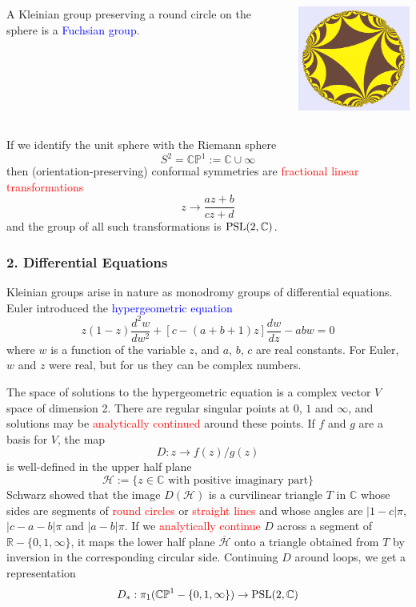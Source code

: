 \documentclass{beamer}
\def\R{\mathbb{R}}
\def\HH{\mathcal{H}}
\def\CP{\mathbb{CP}}
\def\C{\mathbb{C}}
\def\PSL{\textnormal{PSL}}
\begin{document}
\frame
{
\begin{columns}[c]
\column{1.1in}
A Kleinian group 
preserving a round circle
on the sphere is a
\textcolor{blue}{Fuchsian group}.
\column{2in}
\begin{center}
\includegraphics[width=2in]{fuchsian.png}
\end{center}
\end{columns}
}
\frame
{
If we identify the unit sphere with the \textcolor{dgreen}{Riemann sphere} 
$$S^2 = \CP^1:=\C\cup \infty$$
then (orientation-preserving) conformal symmetries are \textcolor{red}{fractional linear
transformations}
$$z \to \frac {az+b} {cz+d}$$
and the group of all such transformations is $\PSL(2,\C)$.
}
\frame
{
\frametitle{2. Differential Equations}

Kleinian groups arise in nature as monodromy groups of \textcolor{dgreen}{differential equations}.
\vskip 5pt
Euler introduced the \textcolor{blue}{hypergeometric equation}
$$z(1-z)\frac {d^2w}{dw^2} + [c - (a+b+1)z]\frac {dw}{dz} - abw = 0$$
where $w$ is a function of the variable $z$, and $a$, $b$, $c$ are real constants.
\vskip 10pt
For Euler, $w$ and $z$ were real, but for us they can be complex numbers.
}
\frame
{The space of solutions to the hypergeometric equation
is a complex vector $V$ space of dimension 2. 
\vskip 10pt
There are \textcolor{dgreen}{regular singular points}
at $0$, $1$ and $\infty$, and solutions may be \textcolor{red}{analytically continued} 
around these points.
\vskip 10pt
If $f$ and $g$ are a basis for $V$, the map $$D:z \to f(z)/g(z)$$ is well-defined
in the \textcolor{dgreen}{upper half plane}
$$\HH:=\lbrace z \in \C \text{ with positive imaginary part} \rbrace$$
}
\frame
{
Schwarz showed that the image $D(\HH)$ is a \textcolor{dgreen}{curvilinear triangle} $T$ in $\C$
whose sides are segments of \textcolor{red}{round circles} or \textcolor{red}{straight lines}
and whose angles are $|1-c|\pi$, $|c-a-b|\pi$ and $|a-b|\pi$.
\vskip 10pt
If we \textcolor{red}{analytically continue} $D$ across a segment of 
$\R - \lbrace 0,1,\infty\rbrace$, it maps
the lower half plane $\overline{\HH}$ onto a triangle obtained from $T$ by \textcolor{dgreen}{inversion}
in the corresponding circular side. 
\vskip 10pt
Continuing $D$ around loops, we get a
representation 
$$D_*:\pi_1(\CP^1 - \lbrace 0,1,\infty\rbrace) \to \PSL(2,\C)$$ 
}
\end{document}
